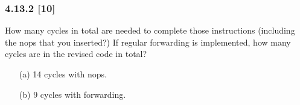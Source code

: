 \documentclass[fleqn]{article}
\begin{document}
\subsubsection*{4.13.2 [10] \textrangle} How many cycles in total are needed to complete those instructions (including the nops that you
inserted?) If regular forwarding is implemented, how many cycles are in the revised code in total?
\begin{itemize}
    \item[(a)] 14 cycles with nops.
    \item[(b)] 9 cycles with forwarding.
\end{itemize}
\vspace{0.125in}
\end{document}
